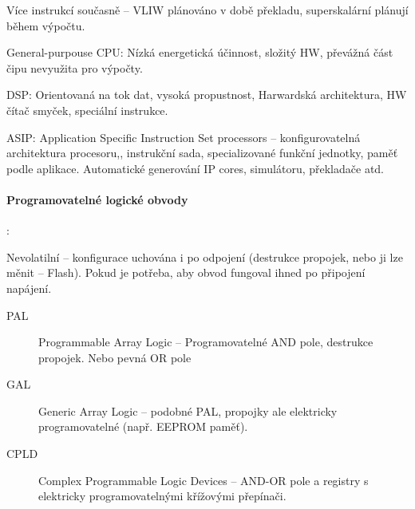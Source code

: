 \documentclass[a4paper, 11pt]{report}
\begin{document}
Více instrukcí současně -- VLIW plánováno v době překladu, superskalární plánují během výpočtu.

General-purpouse CPU: Nízká energetická účinnost, složitý HW, převážná část čipu nevyužita pro výpočty.

DSP: Orientovaná na tok dat, vysoká propustnost, Harwardská architektura, HW čítač smyček, speciální instrukce.

ASIP: Application Specific Instruction Set processors -- konfigurovatelná architektura procesoru,, instrukční sada, specializované funkční jednotky, paměť podle aplikace. Automatické generování IP cores, simulátoru, překladače atd.

\paragraph{Programovatelné logické obvody}:

Nevolatilní -- konfigurace uchována i po odpojení (destrukce propojek, nebo ji lze měnit -- Flash). Pokud je potřeba, aby obvod fungoval ihned po připojení napájení.
\begin{description}
	\item[PAL] Programmable Array Logic -- Programovatelné AND pole, destrukce propojek. Nebo pevná OR pole
	\item[GAL] Generic Array Logic -- podobné PAL, propojky ale elektricky programovatelné (např. EEPROM paměť).
	\item[CPLD] Complex Programmable Logic Devices -- AND-OR pole a registry s elektricky programovatelnými křížovými přepínači.
\end{description}
\end{document}
